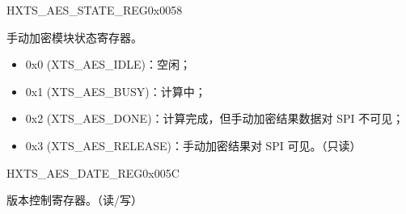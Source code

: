 \begin{register}{H}{XTS\_AES\_STATE\_REG}{0x0058}\label{regdesc:XTSAESSTATEREG}
%
%
\regnewline%
\begin{regdesc}\begin{reglist}
\item [XTS\_AES\_STATE] 手动加密模块状态寄存器。
    \begin{itemize}
        \item 0x0 (XTS\_AES\_IDLE)：空闲；
        \item 0x1 (XTS\_AES\_BUSY)：计算中；
        \item 0x2 (XTS\_AES\_DONE)：计算完成，但手动加密结果数据对 SPI 不可见；
        \item 0x3 (XTS\_AES\_RELEASE)：手动加密结果对 SPI 可见。（只读）
    \end{itemize}
\end{reglist}\end{regdesc}
\end{register}


\begin{register}{H}{XTS\_AES\_DATE\_REG}{0x005C}\label{regdesc:XTSAESDATEREG}
%
%
\regnewline%
\begin{regdesc}\begin{reglist}
\item [XTS\_AES\_DATE] 版本控制寄存器。（读/写）
\end{reglist}\end{regdesc}
\end{register}
